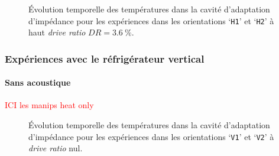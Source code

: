 \begin{figure}[!ht]
    \centering
    
    \caption{\'Evolution temporelle des températures dans la cavité d'adaptation d'impédance pour les expériences dans les orientations `\texttt{H1}' et `\texttt{H2}' à haut \textit{drive ratio} $DR=\qty{3.6}{\percent}$.}
    \label{fig:Acou_CHXout_H1H2_High}
\end{figure}


\subsubsection{Expériences avec le réfrigérateur vertical}
\paragraph{Sans acoustique}
\textcolor{red}{ICI les manips heat only}

\begin{figure}[!ht]
    \centering
    
    \caption{\'Evolution temporelle des températures dans la cavité d'adaptation d'impédance pour les expériences dans les orientations `\texttt{V1}' et `\texttt{V2}' à \textit{drive ratio} nul.}
    \label{fig:HeatOnly_CHXout_V1V2}
\end{figure}

